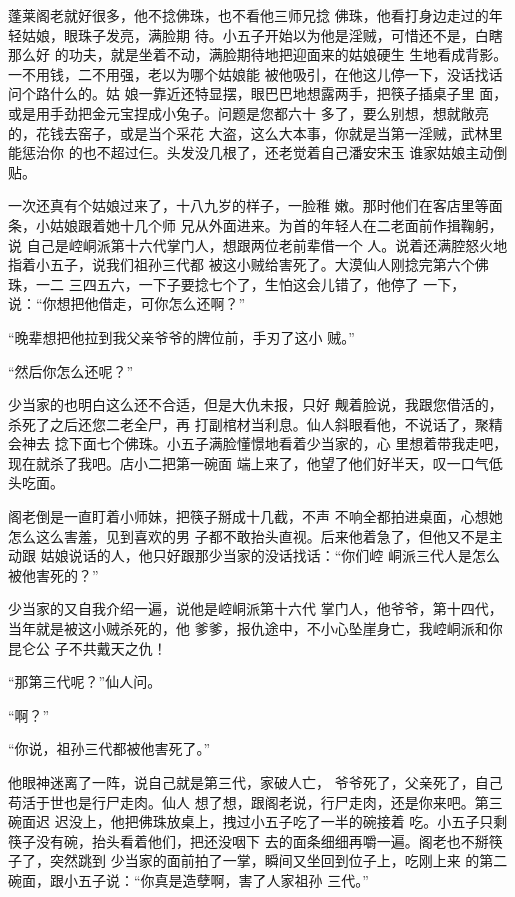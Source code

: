 蓬莱阁老就好很多，他不捻佛珠，也不看他三师兄捻
佛珠，他看打身边走过的年轻姑娘，眼珠子发亮，满脸期
待。小五子开始以为他是淫贼，可惜还不是，白瞎那么好
的功夫，就是坐着不动，满脸期待地把迎面来的姑娘硬生
生地看成背影。一不用钱，二不用强，老以为哪个姑娘能
被他吸引，在他这儿停一下，没话找话问个路什么的。姑
娘一靠近还特显摆，眼巴巴地想露两手，把筷子插桌子里
面，或是用手劲把金元宝捏成小兔子。问题是您都六十
多了，要么别想，想就敞亮的，花钱去窑子，或是当个采花
大盗，这么大本事，你就是当第一淫贼，武林里能惩治你
的也不超过仨。头发没几根了，还老觉着自己潘安宋玉
谁家姑娘主动倒贴。

一次还真有个姑娘过来了，十八九岁的样子，一脸稚
嫩。那时他们在客店里等面条，小姑娘跟着她十几个师
兄从外面进来。为首的年轻人在二老面前作揖鞠躬，说
自己是崆峒派第十六代掌门人，想跟两位老前辈借一个
人。说着还满腔怒火地指着小五子，说我们祖孙三代都
被这小贼给害死了。大漠仙人刚捻完第六个佛珠，一二
三四五六，一下子要捻七个了，生怕这会儿错了，他停了
一下，说：“你想把他借走，可你怎么还啊？”

“晚辈想把他拉到我父亲爷爷的牌位前，手刃了这小
贼。”

“然后你怎么还呢？”

少当家的也明白这么还不合适，但是大仇未报，只好
觍着脸说，我跟您借活的，杀死了之后还您二老全尸，再
打副棺材当利息。仙人斜眼看他，不说话了，聚精会神去
捻下面七个佛珠。小五子满脸懂憬地看着少当家的，心
里想着带我走吧，现在就杀了我吧。店小二把第一碗面
端上来了，他望了他们好半天，叹一口气低头吃面。

阁老倒是一直盯着小师妹，把筷子掰成十几截，不声
不响全都拍进桌面，心想她怎么这么害羞，见到喜欢的男
子都不敢抬头直视。后来他着急了，但他又不是主动跟
姑娘说话的人，他只好跟那少当家的没话找话：“你们崆
峒派三代人是怎么被他害死的？”

少当家的又自我介绍一遍，说他是崆峒派第十六代
掌门人，他爷爷，第十四代，当年就是被这小贼杀死的，他
爹爹，报仇途中，不小心坠崖身亡，我崆峒派和你昆仑公
子不共戴天之仇！

“那第三代呢？”仙人问。

“啊？”

“你说，祖孙三代都被他害死了。”

他眼神迷离了一阵，说自己就是第三代，家破人亡，
爷爷死了，父亲死了，自己苟活于世也是行尸走肉。仙人
想了想，跟阁老说，行尸走肉，还是你来吧。第三碗面迟
迟没上，他把佛珠放桌上，拽过小五子吃了一半的碗接着
吃。小五子只剩筷子没有碗，抬头看着他们，把还没咽下
去的面条细细再嚼一遍。阁老也不掰筷子了，突然跳到
少当家的面前拍了一掌，瞬间又坐回到位子上，吃刚上来
的第二碗面，跟小五子说：“你真是造孽啊，害了人家祖孙
三代。”

